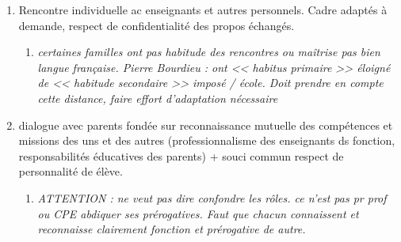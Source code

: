 \documentclass[12pt]{article}
\begin{document}
\begin{itemize}
{\begin{minipage}{19cm}
\begin{enumerate}
\item Rencontre individuelle ac enseignants et autres personnels. Cadre adaptés à demande, respect de confidentialité des propos échangés. \\
\begin{enumerate}
\item \textit{certaines familles ont pas habitude des rencontres ou maîtrise pas bien langue française. Pierre Bourdieu : ont << habitus primaire >> éloigné de << habitude secondaire >> imposé / école. Doit prendre en compte cette distance, faire effort d'adaptation nécessaire}  \\
\end{enumerate}

\item dialogue avec parents fondée sur reconnaissance mutuelle des compétences et missions des uns et des autres (professionnalisme des enseignants ds fonction, responsabilités éducatives des parents) + souci commun respect de personnalité de élève.\\
\begin{enumerate}
\item \textit{ATTENTION : ne veut pas dire confondre les rôles. ce n'est pas pr prof ou CPE abdiquer ses prérogatives. Faut que chacun connaissent et reconnaisse clairement fonction et prérogative de autre.} \\
\end{enumerate}

\end{enumerate}
\end{minipage}
}

\vspace{0.5cm}

\end{itemize}
\end{document}
